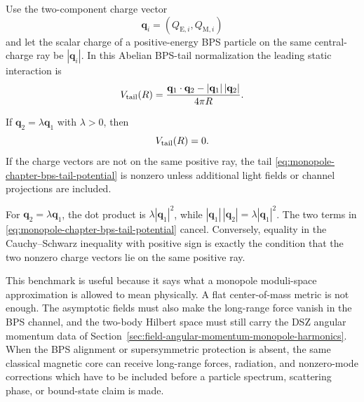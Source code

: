Use the two-component charge vector
\[
  \mathbf q_i=(Q_{\mathrm E,i},Q_{\mathrm M,i})
\]
and let the scalar charge of a positive-energy BPS particle on the same
central-charge ray be \(|\mathbf q_i|\).  In this Abelian BPS-tail
normalization the leading static interaction is
\begin{equation}
  V_{\rm tail}(R)
  =
  \frac{
    \mathbf q_1\cdot\mathbf q_2
    -
    |\mathbf q_1|\,|\mathbf q_2|
  }{4\pi R}.
  \label{eq:monopole-chapter-bps-tail-potential}
\end{equation}

\begin{controlledapproximation}
\label{ca:monopole-chapter-aligned-bps-no-force}
If \(\mathbf q_2=\lambda\mathbf q_1\) with \(\lambda>0\), then
\[
  V_{\rm tail}(R)=0.
\]
If the charge vectors are not on the same positive ray, the tail
\eqref{eq:monopole-chapter-bps-tail-potential} is nonzero unless additional
light fields or channel projections are included.

For \(\mathbf q_2=\lambda\mathbf q_1\), the dot product is
\(\lambda|\mathbf q_1|^2\), while
\(|\mathbf q_1|\,|\mathbf q_2|=\lambda|\mathbf q_1|^2\).  The two terms in
\eqref{eq:monopole-chapter-bps-tail-potential} cancel.  Conversely, equality
in the Cauchy--Schwarz inequality with positive sign is exactly the condition
that the two nonzero charge vectors lie on the same positive ray.
\end{controlledapproximation}

This benchmark is useful because it says what a monopole moduli-space
approximation is allowed to mean physically.  A flat center-of-mass metric is
not enough.  The asymptotic fields must also make the long-range force vanish
in the BPS channel, and the two-body Hilbert space must still carry the DSZ
angular momentum data of Section~\ref{sec:field-angular-momentum-monopole-harmonics}.
When the BPS alignment or supersymmetric protection is absent, the same
classical magnetic core can receive long-range forces, radiation, and
nonzero-mode corrections which have to be included before a particle
spectrum, scattering phase, or bound-state claim is made.
